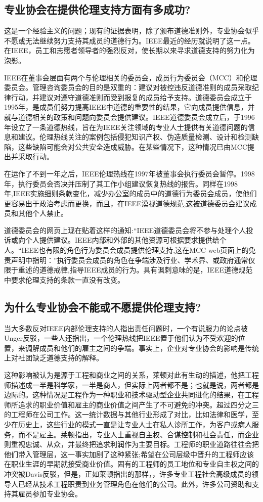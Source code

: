 \documentclass[lang=cn,11pt,a4paper]{elegantpaper}
\begin{document}
\subsection{专业协会在提供伦理支持方面有多成功?}
这是一个经验主义的问题；现有的证据表明，除了颁布道德准则外，专业协会似乎不愿或无法继续努力支持其成员的道德行为。IEEE最近的经历就说明了这一点。在IEEE，员工和志愿者领导者的强烈反对，使长期以来寻求道德支持的努力化为泡影。

IEEE在董事会层面有两个与伦理相关的委员会，成员行为委员会（MCC）和伦理委员会。管理咨询委员会的目的是双重的：建议对被控违反道德准则的成员采取纪律行动，并建议对遵守道德准则而受到报复的成员给予支持。道德委员会成立于1995年，是成员们努力提高IEEE中道德的重要性的结果，它向成员提供信息，并就与道德相关的政策和问题向委员会提供建议。IEEE道德委员会成立后，于1996年设立了一条道德热线，旨在为IEEE关注领域的专业人士提供有关道德问题的信息和建议。伦理热线关注的案例包括侵犯知识产权、伪造质量检测、设计和检测缺陷，这些缺陷可能会对公共安全造成威胁。在某些情况下，这种情况已由MCC\cite{17}提出并采取行动。

在运作了不到一年之后，IEEE伦理热线在1997年被董事会执行委员会暂停。1998年，执行委员会否决并压制了其工作小组建议恢复热线的报告。\cite{17}同样在1998年,IEEE实施细则条款变化，减少办公室的成员中的道德行为委员会成员，使他们更容易出于政治考虑而更换，而且，在IEEE漠视道德规范,这被道德委员会建议成员和其他个人禁止。

道德委员会的网页\cite{18}上现在贴着这样的通知:“IEEE道德委员会将不参与处理个人投诉或向个人提供建议。IEEE内部和外部的其他资源可根据要求提供给个人。“IEEE也有限的角色行为委员会成员提供伦理支持,这在MCC web页面上的免责声明中指明：\cite{19}”执行委员会成员的角色在争端涉及行业、学术界、或政府通常仅限于重述的道德戒律,指导IEEE成员的行为。具有讽刺意味的是，IEEE道德规范中要求伦理支持的条款一直没有改变。

\subsection{为什么专业协会不能或不愿提供伦理支持?}
当大多数反对IEEE内部伦理支持的人指出责任问题时，一个有说服力的论点被Unger\cite{14,17}反驳，一些人还指出，一个伦理热线把IEEE置于他们认为不受欢迎的位置，来调解成员和他们的雇主之间的争端。事实上，企业对专业协会的影响是传统上对社团缺乏道德支持的解释。

这种影响被认为是源于工程和商业之间的关系，莱顿对此有生动的描述，\cite{12}他把工程师描述成一半是科学家，一半是商人，但实际上两者都不是；也就是说，两者都是边际的。这种情况是工程作为一种职业和技术驱动型企业共同进化的结果，在工程师所追求的职业价值和雇主的商业价值之间产生了不可避免的冲突。超过四分之三的工程师在公司工作。这一统计数据与其他行业形成了对比，比如法律和医学，至少在历史上，这些行业的模式一直是让专业人士在私人诊所工作，为客户或病人服务，而不是雇主。莱顿指出，专业人士重视自主权、合谋控制和社会责任，而企业则重视忠诚、从众，并最终把追求利润作为主要目标。工程师的职业道路往往会把他们带入管理层，这一事实加剧了这种紧张;希望在公司层级中晋升的工程师应该在职业生涯的早期就接受商业价值。固有的工程师的员工地位和专业自主权之间的冲突被Davis反驳\cite{14}，但是，正如莱顿指出的那样，\cite{12}，许多专业工程社会高级成员的领导人已经从技术工程职责到业务管理角色在他们的公司。此外，许多公司资助和支持其雇员参加专业协会。
\end{document}
